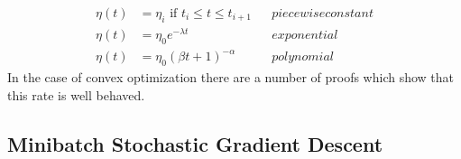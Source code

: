 \begin{equation}
    \begin{aligned}
        \eta(t) &= \eta_i \text{ if } t_i \leq  t \leq t_{i+1} & & piecewise constant\\
        \eta(t) &= \eta_0 e^{-\lambda t} & & exponential\\
        \eta(t) &= \eta_0 (\beta t + 1) ^{-\alpha} && polynomial
    \end{aligned}
\end{equation}
In the case of convex optimization there are a number of proofs which show that this rate is well behaved.

\subsection{Minibatch Stochastic Gradient Descent}